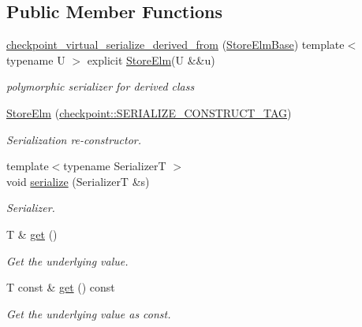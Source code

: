 \subsection*{Public Member Functions}
\begin{DoxyCompactItemize}
\item 
\hyperlink{structvt_1_1vrt_1_1collection_1_1storage_1_1_store_elm_3_01_t_00_01typename_01std_1_1enable__if_947e0655769addb625fb511f777768bd_a045703618378e71f8de2a9f00adbfc3b}{checkpoint\+\_\+virtual\+\_\+serialize\+\_\+derived\+\_\+from} (\hyperlink{structvt_1_1vrt_1_1collection_1_1storage_1_1_store_elm_base}{Store\+Elm\+Base}) template$<$ typename U $>$ explicit \hyperlink{structvt_1_1vrt_1_1collection_1_1storage_1_1_store_elm}{Store\+Elm}(U \&\&u)
\begin{DoxyCompactList}\small\item\em polymorphic serializer for derived class \end{DoxyCompactList}\item 
\hyperlink{structvt_1_1vrt_1_1collection_1_1storage_1_1_store_elm_3_01_t_00_01typename_01std_1_1enable__if_947e0655769addb625fb511f777768bd_ad8dfd05ce5b4a6937906fce29733ac37}{Store\+Elm} (\hyperlink{namespacecheckpoint_a7ff642cff4d72d01a16ab10e9bc363ef}{checkpoint\+::\+S\+E\+R\+I\+A\+L\+I\+Z\+E\+\_\+\+C\+O\+N\+S\+T\+R\+U\+C\+T\+\_\+\+T\+AG})
\begin{DoxyCompactList}\small\item\em Serialization re-\/constructor. \end{DoxyCompactList}\item 
{\footnotesize template$<$typename SerializerT $>$ }\\void \hyperlink{structvt_1_1vrt_1_1collection_1_1storage_1_1_store_elm_3_01_t_00_01typename_01std_1_1enable__if_947e0655769addb625fb511f777768bd_ae4824f71a4909c65fab811ef7b97f9aa}{serialize} (SerializerT \&s)
\begin{DoxyCompactList}\small\item\em Serializer. \end{DoxyCompactList}\item 
T \& \hyperlink{structvt_1_1vrt_1_1collection_1_1storage_1_1_store_elm_3_01_t_00_01typename_01std_1_1enable__if_947e0655769addb625fb511f777768bd_aca0afee85781dbc7e76c3dff59ab4136}{get} ()
\begin{DoxyCompactList}\small\item\em Get the underlying value. \end{DoxyCompactList}\item 
T const  \& \hyperlink{structvt_1_1vrt_1_1collection_1_1storage_1_1_store_elm_3_01_t_00_01typename_01std_1_1enable__if_947e0655769addb625fb511f777768bd_afd8bb1f887dfb0a9d165693b1c7040ae}{get} () const
\begin{DoxyCompactList}\small\item\em Get the underlying value as const. \end{DoxyCompactList}\end{DoxyCompactItemize}
